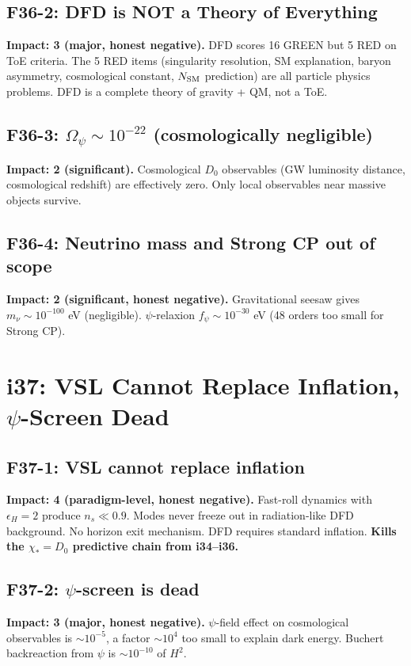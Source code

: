 \documentclass[11pt,a4paper]{article}
\begin{document}
\subsection{F36-2: DFD is NOT a Theory of Everything}
\textbf{Impact: 3 (major, honest negative).} DFD scores 16 GREEN but 5 RED on ToE criteria. The 5 RED items (singularity resolution, SM explanation, baryon asymmetry, cosmological constant, $N_{\rm SM}$ prediction) are all particle physics problems. DFD is a complete theory of gravity + QM, not a ToE.

\subsection{F36-3: $\Omega_\psi \sim 10^{-22}$ (cosmologically negligible)}
\textbf{Impact: 2 (significant).} Cosmological $D_0$ observables (GW luminosity distance, cosmological redshift) are effectively zero. Only local observables near massive objects survive.

\subsection{F36-4: Neutrino mass and Strong CP out of scope}
\textbf{Impact: 2 (significant, honest negative).} Gravitational seesaw gives $m_\nu \sim 10^{-100}$ eV (negligible). $\psi$-relaxion $f_\psi \sim 10^{-30}$ eV (48 orders too small for Strong CP).

\section{i37: VSL Cannot Replace Inflation, $\psi$-Screen Dead}
\label{sec:i37}

\subsection{F37-1: VSL cannot replace inflation}
\textbf{Impact: 4 (paradigm-level, honest negative).} Fast-roll dynamics with $\epsilon_H = 2$ produce $n_s \ll 0.9$. Modes never freeze out in radiation-like DFD background. No horizon exit mechanism. DFD requires standard inflation. \textbf{Kills the $\chi_* = D_0$ predictive chain from i34--i36.}

\subsection{F37-2: $\psi$-screen is dead}
\textbf{Impact: 3 (major, honest negative).} $\psi$-field effect on cosmological observables is $\sim 10^{-5}$, a factor $\sim 10^4$ too small to explain dark energy. Buchert backreaction from $\psi$ is $\sim 10^{-10}$ of $H^2$.
\end{document}
